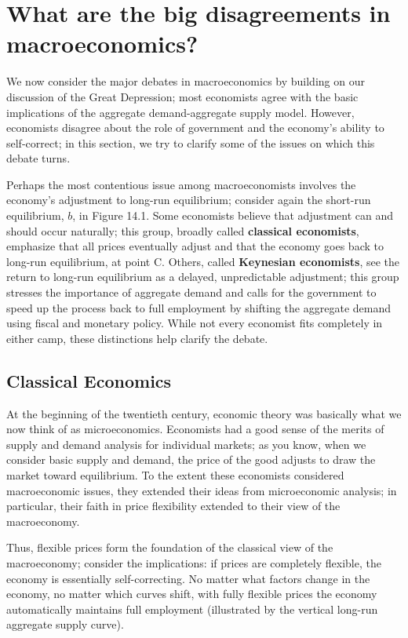 \documentclass[11pt]{article} %
\begin{document}
\section*{What are the big disagreements in macroeconomics?}
We now consider the major debates in macroeconomics by building on our discussion of the Great Depression; most economists agree with the basic implications of the aggregate demand-aggregate supply model. However, economists disagree about the role of government and the economy's ability to self-correct; in this section, we try to clarify some of the issues on which this debate turns.

Perhaps the most contentious issue among macroeconomists involves the economy's adjustment to long-run equilibrium; consider again the short-run equilibrium, $b$, in Figure 14.1. Some economists believe that adjustment can and should occur naturally; this group, broadly called \textbf{classical economists}, emphasize that all prices eventually adjust and that the economy goes back to long-run equilibrium, at point C. Others, called \textbf{Keynesian economists}, see the return to long-run equilibrium as a delayed, unpredictable adjustment; this group stresses the importance of aggregate demand and calls for the government to speed up the process back to full employment by shifting the aggregate demand using fiscal and monetary policy. While not every economist fits completely in either camp, these distinctions help clarify the debate.

\subsection*{Classical Economics}
At the beginning of the twentieth century, economic theory was basically what we now think of as microeconomics. Economists had a good sense of the merits of supply and demand analysis for individual markets; as you know, when we consider basic supply and demand, the price of the good adjusts to draw the market toward equilibrium. To the extent these economists considered macroeconomic issues, they extended their ideas from microeconomic analysis; in particular, their faith in price flexibility extended to their view of the macroeconomy.

Thus, flexible prices form the foundation of the classical view of the macroeconomy; consider the implications: if prices are completely flexible, the economy is essentially self-correcting. No matter what factors change in the economy, no matter which curves shift, with fully flexible prices the economy automatically maintains full employment (illustrated by the vertical long-run aggregate supply curve).
\end{document}
